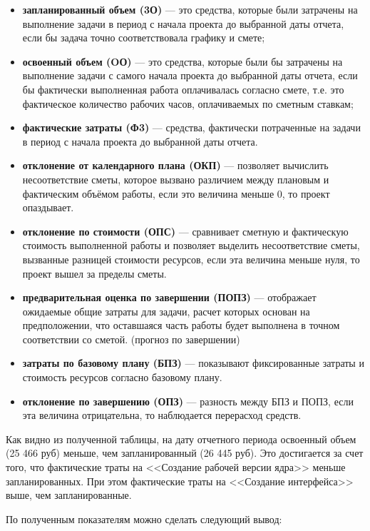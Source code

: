 \begin{itemize}
    \item \textbf{запланированный объем (3О)} --- это средства, которые были затрачены на выполнение задачи в период с начала проекта до выбранной даты отчета, если бы задача точно соответствовала графику и смете;
    \item \textbf{освоенный объем (OО)} --- это средства, которые были бы затрачены на выполнение задачи с самого начала проекта до выбранной даты отчета, если бы фактически выполненная работа оплачивалась согласно смете, т.е. это фактическое количество рабочих часов, оплачиваемых по сметным ставкам;
    \item \textbf{фактические затраты (Ф3)} --- средства, фактически потраченные на задачи в период с начала проекта до выбранной даты отчета.
    \item \textbf{отклонение от календарного плана (ОКП)} --- позволяет вычислить несоответствие сметы, которое вызвано различием между плановым и фактическим объёмом работы, если это величина меньше 0, то проект опаздывает.
    \item \textbf{отклонение по стоимости (ОПС)} --- сравнивает сметную и фактическую стоимость выполненной работы и позволяет выделить несоответствие сметы, вызванные разницей стоимости ресурсов, если эта величина меньше нуля, то проект вышел за пределы сметы.
    \item \textbf{предварительная оценка по завершении (ПОПЗ)} --- отображает ожидаемые общие затраты для задачи, расчет которых основан на предположении, что оставшаяся часть работы будет выполнена в точном соответствии со сметой. (прогноз по завершении)
    \item \textbf{затраты по базовому плану (БПЗ)} --- показывают фиксированные затраты и стоимость ресурсов согласно базовому плану.
    \item \textbf{отклонение по завершению (ОПЗ)} --- разность между БПЗ и ПОПЗ, если эта величина отрицательна, то наблюдается перерасход средств.
\end{itemize}

Как видно из полученной таблицы, на дату отчетного периода освоенный объем (25 466 руб) меньше, чем запланированный (26 445 руб). Это достигается за счет того, что фактические траты на <<Создание рабочей версии ядра>> меньше запланированных. При этом фактические траты на <<Создание интерфейса>> выше, чем запланированные.

По полученным показателям можно сделать следующий вывод:

